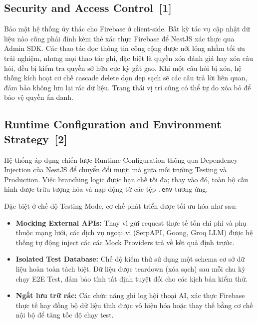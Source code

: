 \documentclass[12pt, a4paper]{article}
\begin{document}
\subsection[Security and Access Control]{Security and Access Control \,{\normalfont\small\textcolor{cyan!70!black}{[1]}}}
Bảo mật hệ thống ủy thác cho Firebase ở client-side. Bất kỳ tác vụ cập nhật dữ liệu nào cũng phải đính kèm thẻ xác thực Firebase để NestJS xác thực qua Admin SDK. Các thao tác đọc thông tin công cộng được nới lỏng nhằm tối ưu trải nghiệm, nhưng mọi thao tác ghi, đặc biệt là quyền xóa đánh giá hay xóa câu hỏi, đều bị kiểm tra quyền sở hữu cực kỳ gắt gao. Khi một câu hỏi bị xóa, hệ thống kích hoạt cơ chế cascade delete dọn dẹp sạch sẽ các câu trả lời liên quan, đảm bảo không lưu lại rác dữ liệu. Trạng thái vị trí cũng có thể tự do xóa bỏ để bảo vệ quyền ẩn danh.

\subsection[Runtime Configuration and Environment Strategy]{Runtime Configuration and Environment Strategy \,{\normalfont\small\textcolor{cyan!70!black}{[2]}}}

Hệ thống áp dụng chiến lược Runtime Configuration thông qua Dependency Injection của NestJS để chuyển đổi mượt mà giữa môi trường Testing và Production. Việc branching logic được hạn chế tối đa; thay vào đó, toàn bộ cấu hình được trừu tượng hóa và nạp động từ các tệp \texttt{.env} tương ứng. 

Đặc biệt ở chế độ Testing Mode, cơ chế phát triển được tối ưu hóa như sau:
\begin{itemize}
    \item \textbf{Mocking External APIs:} Thay vì gửi request thực tế tốn chi phí và phụ thuộc mạng lưới, các dịch vụ ngoại vi (SerpAPI, Goong, Groq LLM) được hệ thống tự động inject các các Mock Providers trả về kết quả định trước. 
    \item \textbf{Isolated Test Database:} Chế độ kiểm thử sử dụng một schema cơ sở dữ liệu hoàn toàn tách biệt. Dữ liệu được teardown (xóa sạch) sau mỗi chu kỳ chạy E2E Test, đảm bảo tính tất định tuyệt đối cho các kịch bản kiểm thử.
    \item \textbf{Ngắt lưu trữ rác:} Các chức năng ghi log hội thoại AI, xác thực Firebase thực tế hay đồng bộ dữ liệu tĩnh được vô hiệu hóa hoặc thay thế bằng cơ chế nội bộ để tăng tốc độ chạy test.
\end{itemize}
\end{document}
